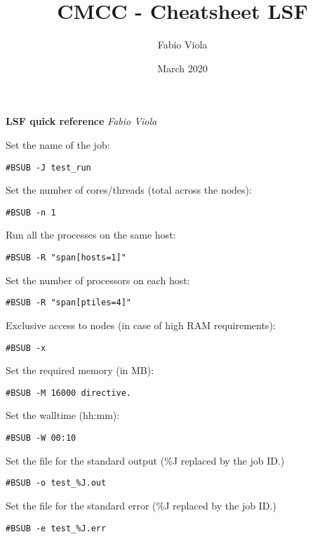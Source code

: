 \documentclass[twocolumn,8pt]{article}
\title{CMCC - Cheatsheet LSF}
\author{Fabio Viola}
\date{March 2020}
\begin{document}

\LARGE \textbf{LSF quick reference}  \hfill \textit{\small Fabio Viola}\normalsize

\begin{mdframed}[frametitle=\#BSUB directives]

Set the name of the job:
\begin{lstlisting}
#BSUB -J test_run
\end{lstlisting}

Set the number of cores/threads (total across the nodes):
\begin{lstlisting}
#BSUB -n 1
\end{lstlisting}

Run all the processes on the same host:
\begin{lstlisting}
#BSUB -R "span[hosts=1]"
\end{lstlisting}

Set the number of processors on each host:
\begin{lstlisting}
#BSUB -R "span[ptiles=4]"
\end{lstlisting}

Exclusive access to nodes (in case of high RAM requirements):
\begin{lstlisting}
#BSUB -x
\end{lstlisting}

Set the required memory (in MB):
\begin{lstlisting}
#BSUB -M 16000 directive.
\end{lstlisting}

Set the walltime (hh:mm):
\begin{lstlisting}
#BSUB -W 00:10
\end{lstlisting}

Set the file for the standard output (\%J replaced by the job ID.)
\begin{lstlisting}
#BSUB -o test_%J.out
\end{lstlisting}

Set the file for the standard error (\%J replaced by the job ID.)
\begin{lstlisting}
#BSUB -e test_%J.err
\end{lstlisting}


\end{mdframed}
\end{document}
